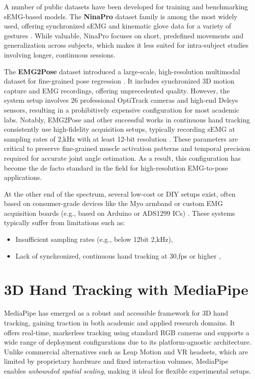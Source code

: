A number of public datasets have been developed for training and benchmarking sEMG-based models. The \textbf{NinaPro} dataset family is among the most widely used, offering synchronized sEMG and kinematic glove data for a variety of gestures \cite{zia2018multiday}. While valuable, NinaPro focuses on short, predefined movements and generalization across subjects, which makes it less suited for intra-subject studies involving longer, continuous sessions.

The \textbf{EMG2Pose} dataset introduced a large-scale, high-resolution multimodal dataset for fine-grained pose regression \cite{salter2024emg2pose}. It includes synchronized 3D motion capture and EMG recordings, offering unprecedented quality. However, the system setup involves 26 professional OptiTrack cameras and high-end Delsys sensors, resulting in a prohibitively expensive configuration for most academic labs. Notably, EMG2Pose and other successful works in continuous hand tracking consistently use high-fidelity acquisition setups, typically recording sEMG at sampling rates of 2,kHz with at least 12-bit resolution \cite{salter2024emg2pose, zanghieri2023semg, lee2022explainable}. These parameters are critical to preserve fine-grained muscle activation patterns and temporal precision required for accurate joint angle estimation. As a result, this configuration has become the de facto standard in the field for high-resolution EMG-to-pose applications.

At the other end of the spectrum, several low-cost or DIY setups exist, often based on consumer-grade devices like the Myo armband or custom EMG acquisition boards (e.g., based on Arduino or ADS1299 ICs) \cite{nasri2020semg}. These systems typically suffer from limitations such as:
\begin{itemize}
    \item Insufficient sampling rates (e.g., below 12bit 2,kHz),
    \item Lack of synchronized, continuous hand tracking at 30,fps or higher \cite{graf2023combining},
\end{itemize}

\section{3D Hand Tracking with MediaPipe}

MediaPipe has emerged as a robust and accessible framework for 3D hand tracking, gaining traction in both academic and applied research domains. It offers real-time, markerless tracking using standard RGB cameras and supports a wide range of deployment configurations due to its platform-agnostic architecture. Unlike commercial alternatives such as Leap Motion and VR headsets, which are limited by proprietary hardware and fixed interaction volumes, MediaPipe enables \textit{unbounded spatial scaling}, making it ideal for flexible experimental setups.

